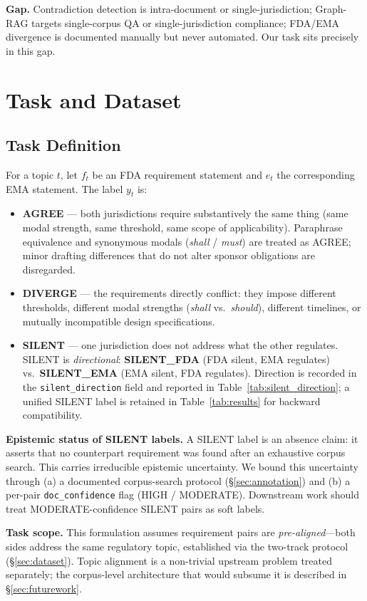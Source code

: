 \documentclass[manuscript]{acmart}
\begin{document}
\textbf{Gap.} Contradiction detection is intra-document or
single-jurisdiction; Graph-RAG targets single-corpus QA or
single-jurisdiction compliance; FDA/EMA divergence is documented manually but
never automated. Our task sits precisely in this gap.

\section{Task and Dataset}

\subsection{Task Definition}
\label{sec:taskdef}

\begin{revblock}
For a topic $t$, let $f_t$ be an FDA requirement statement and $e_t$ the
corresponding EMA statement. The label $y_t$ is:
\begin{itemize}
\item \textbf{AGREE} --- both jurisdictions require substantively the same
  thing (same modal strength, same threshold, same scope of applicability).
  Paraphrase equivalence and synonymous modals (\textit{shall} / \textit{must})
  are treated as AGREE; minor drafting differences that do not alter sponsor
  obligations are disregarded.
\item \textbf{DIVERGE} --- the requirements directly conflict: they impose
  different thresholds, different modal strengths (\textit{shall} vs.\
  \textit{should}), different timelines, or mutually incompatible design
  specifications.
\item \textbf{SILENT} --- one jurisdiction does not address what the other
  regulates. SILENT is \textit{directional}: \textbf{SILENT\_FDA} (FDA silent,
  EMA regulates) vs.\ \textbf{SILENT\_EMA} (EMA silent, FDA regulates).
  Direction is recorded in the \texttt{silent\_direction} field and reported
  in Table~\ref{tab:silent_direction}; a unified SILENT label is retained in
  Table~\ref{tab:results} for backward compatibility.
\end{itemize}

\textbf{Epistemic status of SILENT labels.}
A SILENT label is an absence claim: it asserts that no counterpart requirement
was found after an exhaustive corpus search. This carries irreducible epistemic
uncertainty. We bound this uncertainty through (a) a documented corpus-search
protocol (\S\ref{sec:annotation}) and (b) a per-pair \texttt{doc\_confidence}
flag (HIGH / MODERATE). Downstream work should treat MODERATE-confidence SILENT
pairs as soft labels.

\textbf{Task scope.} This formulation assumes requirement pairs are
\textit{pre-aligned}---both sides address the same regulatory topic, established
via the two-track protocol (\S\ref{sec:dataset}). Topic alignment is a
non-trivial upstream problem treated separately; the corpus-level architecture
that would subsume it is described in \S\ref{sec:futurework}.
\end{revblock}
\end{document}
